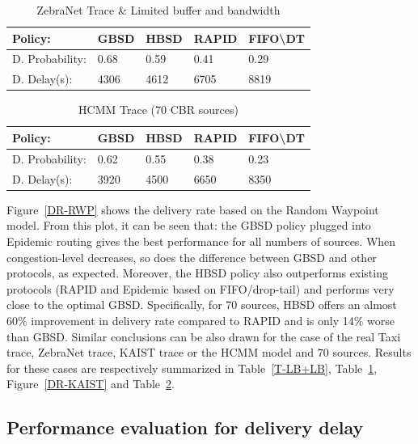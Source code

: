 \begin{table}[!h]
\renewcommand{\arraystretch}{1.1}
\caption{ZebraNet Trace \& Limited buffer and bandwidth}
\centering
\footnotesize
\begin{tabular}{|p{2.5cm}||p{0.9cm}||p{0.9cm}||p{0.9cm}||p{1.5cm}|}
\hline
\bfseries Policy: & GBSD & HBSD & RAPID & FIFO\textbackslash DT\\
\hline\hline
D. Probability:&0.68&0.59&0.41&0.29\\
\hline\hline
D. Delay(s):&4306&4612&6705&8819\\
\hline
\end{tabular}
\label{ZebraNetResults}
\end{table}


\begin{table}[!h]
\renewcommand{\arraystretch}{1.1}
\caption{HCMM Trace (70 CBR sources)}
\centering
\footnotesize
\begin{tabular}{|p{1.8cm}|p{0.9cm}|p{0.9cm}|p{0.9cm}|p{1.5cm}|}
\hline
\bfseries Policy: & GBSD & HBSD & RAPID & FIFO\textbackslash DT\\
\hline
D. Probability:&0.62&0.55&0.38&0.23\\
\hline
D. Delay(s):&3920&4500&6650&8350\\
\hline
\end{tabular}
\label{HCMM-Results}
\end{table}

Figure~\ref{DR-RWP} shows the delivery rate based on the Random Waypoint model. From this plot, it can be seen that: the GBSD policy plugged into Epidemic routing gives the best performance for all numbers of sources. When congestion-level decreases, so does the difference between GBSD and other protocols, as expected. Moreover, the HBSD policy also outperforms existing protocols (RAPID and Epidemic based on FIFO/drop-tail) and performs very close to the optimal GBSD. Specifically, for $70$ sources, HBSD offers an almost 60\% improvement in delivery rate compared to RAPID and is only 14\% worse than GBSD. Similar conclusions can be also drawn for the case of the real Taxi trace, ZebraNet trace, KAIST trace or the HCMM model and $70$ sources. Results for these cases are respectively summarized in Table~\ref{T-LB+LB}, Table~\ref{ZebraNetResults}, Figure~\ref{DR-KAIST} and Table~\ref{HCMM-Results}.

\subsection{Performance evaluation for delivery delay}
\label{sec:sims:DD}

